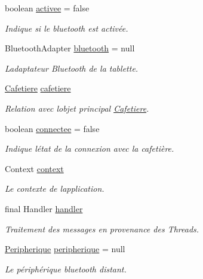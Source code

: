 \begin{DoxyCompactItemize}
\item 
boolean \hyperlink{classcom_1_1example_1_1ekawa_1_1_communication_a2f49177a9865ed41a759bce83658bb6e}{activee} = false
\begin{DoxyCompactList}\small\item\em Indique si le bluetooth est activée. \end{DoxyCompactList}\item 
Bluetooth\+Adapter \hyperlink{classcom_1_1example_1_1ekawa_1_1_communication_a0ed43f74b2eae7e8f150b049953da384}{bluetooth} = null
\begin{DoxyCompactList}\small\item\em L\textquotesingle{}adaptateur Bluetooth de la tablette. \end{DoxyCompactList}\item 
\hyperlink{classcom_1_1example_1_1ekawa_1_1_cafetiere}{Cafetiere} \hyperlink{classcom_1_1example_1_1ekawa_1_1_communication_a3b69b78cdf60bc35b2e3e564519dc1b6}{cafetiere}
\begin{DoxyCompactList}\small\item\em Relation avec l\textquotesingle{}objet principal \hyperlink{classcom_1_1example_1_1ekawa_1_1_cafetiere}{Cafetiere}. \end{DoxyCompactList}\item 
boolean \hyperlink{classcom_1_1example_1_1ekawa_1_1_communication_a93d9caaa9d4454a32d9dc28a6f22d2eb}{connectee} = false
\begin{DoxyCompactList}\small\item\em Indique l\textquotesingle{}état de la connexion avec la cafetière. \end{DoxyCompactList}\item 
Context \hyperlink{classcom_1_1example_1_1ekawa_1_1_communication_aa5ae3c4eaab6ec31d3b358431e812d00}{context}
\begin{DoxyCompactList}\small\item\em Le contexte de l\textquotesingle{}application. \end{DoxyCompactList}\item 
final Handler \hyperlink{classcom_1_1example_1_1ekawa_1_1_communication_ae1e1b4415de23491b36f0bd70da2f164}{handler}
\begin{DoxyCompactList}\small\item\em Traitement des messages en provenance des Threads. \end{DoxyCompactList}\item 
\hyperlink{classcom_1_1example_1_1ekawa_1_1_peripherique}{Peripherique} \hyperlink{classcom_1_1example_1_1ekawa_1_1_communication_a59a25b4807148701560e4341f79c0c16}{peripherique} = null
\begin{DoxyCompactList}\small\item\em Le périphérique bluetooth distant. \end{DoxyCompactList}\end{DoxyCompactItemize}
